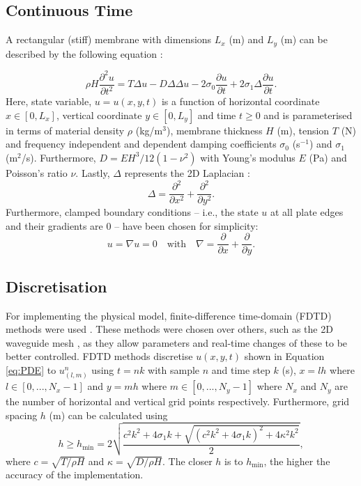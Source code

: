 \documentclass{article}
\begin{document}
\subsection{Continuous Time}
A rectangular (stiff) membrane with dimensions $L_x$ (m) and $L_y$ (m) can be described by the following equation \cite{bilbao2009numerical}:

\begin{equation}\label{eq:PDE}
\rho H\frac{\partial^2u}{\partial t^2} = T\Delta u - D\Delta\Delta u - 2 \sigma_0\frac{\partial u}{\partial t} + 2 \sigma_1 \Delta \frac{\partial u}{\partial t}.
\end{equation}
Here, state variable, $u = u(x,y,t)$ is a function of horizontal coordinate $x \in [0, L_x]$, vertical coordinate $y \in [0, L_y]$ and time $t\geq0$ and is parameterised in terms of material density $\rho$ (kg/m$^3$), membrane thickness $H$ (m), tension $T$ (N) and frequency independent and dependent damping coefficients $\sigma_0$ (s$^{-1}$) and $\sigma_1$ (m$^2$/s). Furthermore, $D = EH^3/12(1-\nu^2)$ with Young's modulus $E$ (Pa) and Poisson's ratio $\nu$. Lastly, $\Delta$ represents the 2D Laplacian \cite{bilbao2009numerical}:
\begin{equation}
    \Delta = \frac{\partial^2}{\partial x^2} + \frac{\partial^2}{\partial y^2}.
\end{equation}
Furthermore, clamped boundary conditions -- i.e., the state $u$ at all plate edges and their gradients are 0 -- have been chosen for simplicity:
\begin{equation}
    u = \nabla u = 0 \quad \text{with} \quad \nabla = \frac{\partial}{\partial x} + \frac{\partial}{\partial y}.
\end{equation}
\subsection{Discretisation}
For implementing the physical model, finite-difference time-domain (FDTD) methods were used \cite{bilbao2009numerical}. These methods were chosen over others, such as the 2D waveguide mesh \cite{Duyne1993}, as they allow parameters and real-time changes of these to be better controlled. FDTD methods discretise $u(x,y,t)$ shown in Equation \eqref{eq:PDE} to $u_{(l,m)}^n$ using $t = nk$ with sample $n$ and time step $k$ (s), $x=lh$ where $l \in [0, ..., N_x-1]$ and $y=mh$ where $m \in [0, ..., N_y-1]$ where $N_x$ and $N_y$ are the number of horizontal and vertical grid points respectively. Furthermore, grid spacing $h$ (m) can be calculated using 
\begin{equation}\label{eq:h}
    h \geq h_\text{min} =  2\sqrt{\frac{c^2k^2 + 4\sigma_1k + \sqrt{(c^2k^2 + 4\sigma_1k)^2 + 4\kappa^2 k^2} }{2}},
\end{equation}
where $c = \sqrt{T/\rho H}$ and $\kappa = \sqrt{D/\rho H}$. The closer $h$ is to $h_\text{min}$, the higher the accuracy of the implementation.
\end{document}
